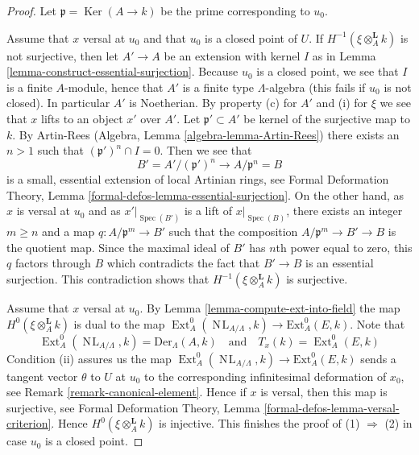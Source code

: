 \documentclass{stacks-project}
\theoremstyle{plain}
\theoremstyle{definition}
\theoremstyle{remark}
\numberwithin{equation}{subsection}
\def\Spec{\mathop{\mathrm{Spec}}}
\def\Ext{\mathop{\mathrm{Ext}}\nolimits}
\def\NL{\mathop{N\!L}\nolimits}
\def\Ker{\mathop{\mathrm{Ker}}}
\begin{document}
\begin{proof}
Let $\mathfrak p = \Ker(A \to k)$ be the prime corresponding to $u_0$.

\medskip\noindent
Assume that $x$ versal at $u_0$ and that $u_0$ is a closed point of $U$.
If $H^{-1}(\xi \otimes_A^{\mathbf{L}} k)$ is not surjective, then
let $A' \to A$ be an extension with kernel $I$ as in
Lemma \ref{lemma-construct-essential-surjection}.
Because $u_0$ is a closed point, we see that $I$ is a finite $A$-module,
hence that $A'$ is a finite type $\Lambda$-algebra (this fails if
$u_0$ is not closed). In particular $A'$ is Noetherian.
By property (c) for $A'$ and (i) for $\xi$ we see that $x$ lifts to
an object $x'$ over $A'$.
Let $\mathfrak p' \subset A'$ be kernel of the surjective map to $k$.
By Artin-Rees (Algebra, Lemma \ref{algebra-lemma-Artin-Rees})
there exists an $n > 1$ such that $(\mathfrak p')^n \cap I = 0$.
Then we see that
$$
B' = A'/(\mathfrak p')^n \longrightarrow A/\mathfrak p^n = B
$$
is a small, essential extension of local Artinian rings, see
Formal Deformation Theory, Lemma
\ref{formal-defos-lemma-essential-surjection}.
On the other hand, as $x$ is versal at $u_0$ and as $x'|_{\Spec(B')}$
is a lift of $x|_{\Spec(B)}$, there exists an integer
$m \geq n$ and a map $q : A/\mathfrak p^m \to B'$
such that the composition
$A/\mathfrak p^m \to B' \to B$ is the quotient map.
Since the maximal ideal of $B'$ has $n$th power equal to zero, this
$q$ factors through $B$ which contradicts the fact that $B' \to B$ is an
essential surjection. This contradiction shows that
$H^{-1}(\xi \otimes_A^{\mathbf{L}} k)$
is surjective.

\medskip\noindent
Assume that $x$ versal at $u_0$. By Lemma \ref{lemma-compute-ext-into-field}
the map $H^0(\xi \otimes_A^{\mathbf{L}} k)$ is dual to the map
$\Ext^0_A(\NL_{A/\Lambda}, k) \to \text{Ext}^0_A(E, k)$. Note that
$$
\Ext^0_A(\NL_{A/\Lambda}, k) = \text{Der}_\Lambda(A, k)
\quad\text{and}\quad
T_x(k) = \Ext^0_A(E, k)
$$
Condition (ii) assures us the map
$\Ext^0_A(\NL_{A/\Lambda}, k) \to \text{Ext}^0_A(E, k)$
sends a tangent vector $\theta$ to $U$ at $u_0$ to the corresponding
infinitesimal deformation of $x_0$, see Remark \ref{remark-canonical-element}.
Hence if $x$ is versal, then this map is surjective, see
Formal Deformation Theory, Lemma \ref{formal-defos-lemma-versal-criterion}.
Hence $H^0(\xi \otimes_A^{\mathbf{L}} k)$ is injective.
This finishes the proof of (1) $\Rightarrow$ (2) in case $u_0$ is a
closed point.


\end{proof}
\end{document}

